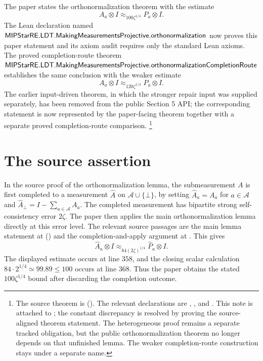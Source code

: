 \documentclass{article}
\begin{document}
The paper states the orthonormalization theorem with the estimate
\[
  A_a \otimes I \approx_{100\zeta^{1/4}} P_a \otimes I.
\]
The Lean declaration named
\(\textsf{MIPStarRE.LDT.MakingMeasurementsProjective.orthonormalization}\)
now proves this paper statement and its axiom audit requires only the standard
Lean axioms.
The proved completion-route theorem
\(\textsf{MIPStarRE.LDT.MakingMeasurementsProjective.orthonormalizationCompletionRoute}\)
establishes the same conclusion with the weaker estimate
\[
  A_a \otimes I \approx_{120\zeta^{1/4}} P_a \otimes I.
\]
The earlier input-driven theorem, in which the stronger repair input was
supplied separately, has been removed from the public Section 5 API; the
corresponding statement is now represented by the paper-facing theorem together
with a separate proved completion-route comparison.%
\footnote{The source theorem is
().  The relevant declarations are
,
,
and .
This note is attached to ; the constant discrepancy is resolved
by proving the source-aligned theorem statement.  The heterogeneous
 proof remains a separate tracked
obligation, but the public orthonormalization theorem no longer depends on that
unfinished lemma.  The weaker completion-route construction stays under a
separate name.}

\section{The source assertion}

In the source proof of the orthonormalization lemma, the submeasurement \(A\)
is first completed to a measurement \(\widehat A\) on
\(\mathcal A\cup\{\bot\}\), by setting \(\widehat A_a=A_a\) for
\(a\in\mathcal A\) and
\(\widehat A_\bot=I-\sum_{a\in\mathcal A} A_a\).  The completed measurement
has bipartite strong self-consistency error \(2\zeta\).  The paper then applies
the main orthonormalization lemma directly at this error level.  The relevant
source passages are the main lemma statement at
() and the completion-and-apply
argument at .
This gives
\[
  \widehat A_a \otimes I
    \approx_{84(2\zeta)^{1/4}}
  \widehat P_a \otimes I.
\]
The displayed estimate occurs at line \(358\), and the closing scalar
calculation \(84\cdot 2^{1/4}\simeq 99.89 \le 100\) occurs at line \(368\).
Thus the paper obtains the stated \(100\zeta^{1/4}\) bound after
discarding the completion outcome.
\end{document}

